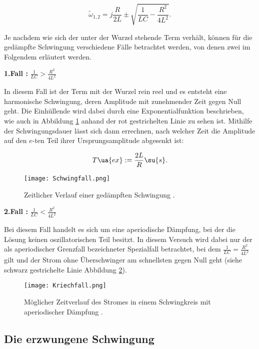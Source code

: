 \begin{equation}
  \tilde{\omega}_{1,2} = j \frac{R}{2L} \pm \sqrt{ \frac{1}{LC} - \frac{R^2}{4L^2}} .
\end{equation}

Je nachdem wie sich der unter der Wurzel stehende Term verhält, können für die
gedämpfte Schwingung verschiedene Fälle betrachtet werden, von denen zwei im Folgendem
erläutert werden.

\textbf{1.Fall :} $\frac{1}{LC} > \frac{R^2}{4L^2}$

In diesem Fall ist der Term mit der Wurzel rein reel und  es entsteht eine
harmonische Schwingung, deren Amplitude mit zunehmender
Zeit gegen Null geht. Die Einhüllende wird dabei durch eine Exponentialfunktion
beschrieben, wie auch in Abbildung \ref{fig:Schwingfall} anhand der rot gestrichelten
Linie zu sehen ist.
Mithilfe der Schwingungsdauer lässt sich dann errechnen, nach welcher
Zeit die Amplitude auf den $e$-ten Teil ihrer Ursprungsamplitude abgesenkt ist:

\begin{equation}
  \label{eqn:T_ex}
  T\ua{ex} := \frac{2L}{R} \su{s} .
\end{equation}

\begin{figure}
  \centering
  \texttt{[image: Schwingfall.png]}
  \caption{Zeitlicher Verlauf einer gedämpften Schwingung \cite{anleitung01}.}
  \label{fig:Schwingfall}
\end{figure}

\textbf{2.Fall :} $\frac{1}{LC} < \frac{R^2}{4L^2}$

Bei diesem Fall handelt es sich um eine aperiodische Dämpfung, bei der die Lösung
keinen oszillatorischen Teil besitzt. In diesem Versuch wird dabei nur der als
aperiodischer Grenzfall bezeichneter Spezialfall betrachtet, bei dem
$\frac{1}{LC} = \frac{R^2}{4L^2}$ gilt und der Strom ohne Überschwinger am schnellsten
gegen Null geht (siehe schwarz gestrichelte Linie Abbildung \ref{fig:Kriechfall}).

\begin{figure}
  \texttt{[image: Kriechfall.png]}
  \caption{Möglicher Zeitverlauf des Stromes in einem Schwingkreis mit aperiodischer Dämpfung \cite{anleitung01}.}
  \label{fig:Kriechfall}
\end{figure}

\newpage

\subsection{Die erzwungene Schwingung}

